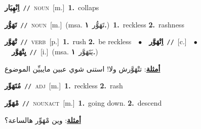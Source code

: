 \documentclass[10pt,a4paper,twoside]{article} %
\begin{document}
\begin{multicols}{2}
{\setlength\topsep{0pt}\textbf{\foreignlanguage{arabic}{اِنْهِيَار}}\ {\color{gray}\texttt{//}\color{black}}\ \textsc{noun}\ [m.]\ \textbf{1.}~collaps\ } \vspace{2mm}

{\setlength\topsep{0pt}\textbf{\foreignlanguage{arabic}{تَهَوُّر}}\ {\color{gray}\texttt{//}\color{black}}\ \textsc{noun}\ [m.]\ \color{gray}(msa. \foreignlanguage{arabic}{تَهَوُّر}~\foreignlanguage{arabic}{\textbf{١.}})\color{black}\ \textbf{1.}~reckless  \textbf{2.}~rashness\ } \vspace{2mm}

{\setlength\topsep{0pt}\textbf{\foreignlanguage{arabic}{تْهَوَّر}}\ {\color{gray}\texttt{//}\color{black}}\ \textsc{verb}\ [p.]\ \textbf{1.}~rush  \textbf{2.}~be reckless\ \ $\bullet$\ \ \setlength\topsep{0pt}\textbf{\foreignlanguage{arabic}{اِتْهَوَّر}}\ {\color{gray}\texttt{//}\color{black}}\ [c.]\ \ $\bullet$\ \ \setlength\topsep{0pt}\textbf{\foreignlanguage{arabic}{يِتْهَوَّر}}\ {\color{gray}\texttt{//}\color{black}}\ [i.]\ \color{gray}(msa. \foreignlanguage{arabic}{يَتَهَوَّر}~\foreignlanguage{arabic}{\textbf{١.}})\color{black}\  \begin{flushright}\color{gray}\foreignlanguage{arabic}{\textbf{\underline{\foreignlanguage{arabic}{أمثلة}}}: تتْهَوَّرش ولا! استنى شوي عبين مايبيِّن الموضوع}\end{flushright}\color{black}} \vspace{2mm}

{\setlength\topsep{0pt}\textbf{\foreignlanguage{arabic}{مُتَهَوِّر}}\ {\color{gray}\texttt{//}\color{black}}\ \textsc{adj}\ [m.]\ \textbf{1.}~reckless  \textbf{2.}~rash\ } \vspace{2mm}

{\setlength\topsep{0pt}\textbf{\foreignlanguage{arabic}{مْهَوِّر}}\ {\color{gray}\texttt{//}\color{black}}\ \textsc{noun\textunderscore act}\ [m.]\ \textbf{1.}~going down.  \textbf{2.}~descend\  \begin{flushright}\color{gray}\foreignlanguage{arabic}{\textbf{\underline{\foreignlanguage{arabic}{أمثلة}}}: وين مْهَوِّر هالساعة؟}\end{flushright}\color{black}} \vspace{2mm}


\end{multicols}
\end{document}
